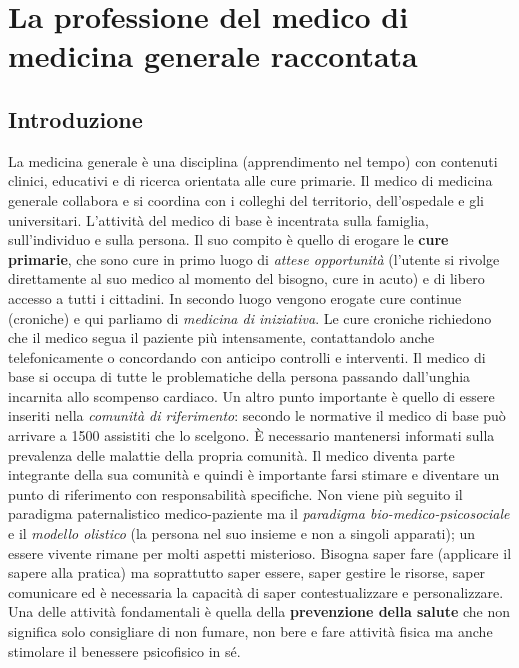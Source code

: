 \section{La professione del medico di medicina generale raccontata}

\subsection{Introduzione}

La medicina generale è una disciplina (apprendimento nel tempo) con
contenuti clinici, educativi e di ricerca orientata alle cure primarie.
Il medico di medicina generale collabora e si coordina con i colleghi
del territorio, dell'ospedale e gli universitari. L'attività del medico
di base è incentrata sulla famiglia, sull'individuo e sulla persona. Il
suo compito è quello di erogare le \textbf{cure primarie}, che sono cure
in primo luogo di \emph{attese opportunità} (l'utente si rivolge
direttamente al suo medico al momento del bisogno, cure in acuto) e di
libero accesso a tutti i cittadini. In secondo luogo vengono erogate
cure continue (croniche) e qui parliamo di \emph{medicina di
iniziativa}. Le cure croniche richiedono che il medico segua il paziente
più intensamente, contattandolo anche telefonicamente o concordando con
anticipo controlli e interventi. Il medico di base si occupa di tutte le
problematiche della persona passando dall'unghia incarnita allo
scompenso cardiaco. Un altro punto importante è quello di essere
inseriti nella \emph{comunità di riferimento}: secondo le normative il
medico di base può arrivare a 1500 assistiti che lo scelgono. È
necessario mantenersi informati sulla prevalenza delle malattie della
propria comunità. Il medico diventa parte integrante della sua comunità
e quindi è importante farsi stimare e diventare un punto di riferimento
con responsabilità specifiche. Non viene più seguito il paradigma
paternalistico medico-paziente ma il \emph{paradigma
bio-medico-psicosociale} e il \emph{modello olistico} (la persona nel
suo insieme e non a singoli apparati); un essere vivente rimane per
molti aspetti misterioso. Bisogna saper fare (applicare il sapere alla
pratica) ma soprattutto saper essere, saper gestire le risorse, saper
comunicare ed è necessaria la capacità di saper contestualizzare e
personalizzare. Una delle attività fondamentali è quella della
\textbf{prevenzione della salute} che non significa solo consigliare di
non fumare, non bere e fare attività fisica ma anche stimolare il
benessere psicofisico in sé.

